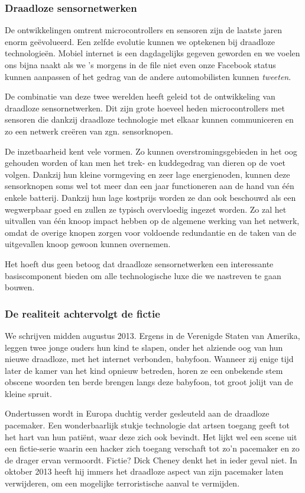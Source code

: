 \documentclass[DIV=calc,paper=a4,fontsize=11pt,twocolumn,draft]{scrartcl}
\newcommand{\heading}[1]{
\subsubsection*{#1}
\vspace{-2mm}
}
\begin{document}
\heading{Draadloze sensornetwerken}

De ontwikkelingen omtrent microcontrollers en sensoren zijn de laatste jaren
enorm ge\"evolueerd. Een zelfde evolutie kunnen we optekenen bij draadloze
technologie\"en. Mobiel internet is een dagdagelijks gegeven geworden en we
voelen ons bijna naakt als we 's morgens in de file niet even onze Facebook
status kunnen aanpassen of het gedrag van de andere automobilisten kunnen
\emph{tweeten}.

De combinatie van deze twee werelden heeft geleid tot de ontwikkeling van
draadloze sensornetwerken. Dit zijn grote hoeveel heden microcontrollers met
sensoren die dankzij draadloze technologie met elkaar kunnen communiceren en zo
een netwerk cre\"eren van zgn. sensorknopen.

De inzetbaarheid kent vele vormen. Zo kunnen overstromingsgebieden in het oog
gehouden worden of kan men het trek- en kuddegedrag van dieren op de voet
volgen. Dankzij hun kleine vormgeving en zeer lage energienoden, kunnen deze
sensorknopen soms wel tot meer dan een jaar functioneren aan de hand van
\'e\'en enkele batterij. Dankzij hun lage kostprijs worden ze dan ook beschouwd
als een wegwerpbaar goed en zullen ze typisch overvloedig ingezet worden. Zo
zal het uitvallen van \'e\'en knoop impact hebben op de algemene werking van
het netwerk, omdat de overige knopen zorgen voor voldoende redundantie en de
taken van de uitgevallen knoop gewoon kunnen overnemen.

Het hoeft dus geen betoog dat draadloze sensornetwerken een interessante
basiscomponent bieden om alle technologische luxe die we nastreven te gaan
bouwen.

\heading{De realiteit achtervolgt de fictie}

We schrijven midden augustus 2013. Ergens in de Verenigde Staten van Amerika,
leggen twee jonge ouders hun kind te slapen, onder het alziende oog van hun
nieuwe draadloze, met het internet verbonden, babyfoon. Wanneer zij enige tijd
later de kamer van het kind opnieuw betreden, horen ze een onbekende stem
obscene woorden ten berde brengen langs deze babyfoon, tot groot jolijt van de
kleine spruit.

Ondertussen wordt in Europa duchtig verder gesleuteld aan de draadloze
pacemaker. Een wonderbaarlijk stukje technologie dat artsen toegang geeft tot
het hart van hun pati\"ent, waar deze zich ook bevindt. Het lijkt wel een scene
uit een fictie-serie waarin een hacker zich toegang verschaft tot zo'n
pacemaker en zo de drager ervan vermoordt. Fictie? Dick Cheney denkt het in
ieder geval niet. In oktober 2013 heeft hij immers het draadloze aspect van
zijn pacemaker laten verwijderen, om een mogelijke terroristische aanval te
vermijden.
\end{document}
